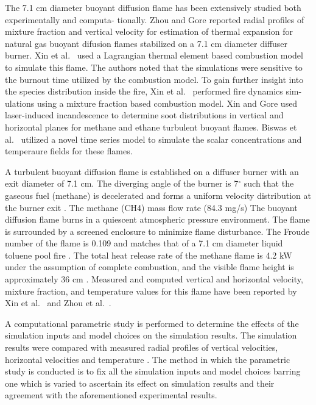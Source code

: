The 7.1 cm diameter buoyant diffusion flame has been extensively studied both experimentally and computa- tionally. Zhou and Gore \cite{Zhou:CS1998} reported radial profiles of mixture fraction and vertical velocity for estimation of thermal expansion for natural gas buoyant difusion flames stabilized on a 7.1 cm diameter diffuser burner. Xin et al.~\cite{Xin:CSS2002} used a Lagrangian thermal element based combustion model to simulate this flame. The authors noted that the simulations were sensitive to the burnout time utilized by the combustion model. To gain further insight into the species distribution inside the fire, Xin et al.~\cite{Xin:CF2005} performed fire dynamics sim- ulations using a mixture fraction based combustion model. Xin and Gore \cite{Xin:CS2005} used laser-induced incandescence to determine soot distributions in vertical and horizontal planes for methane and ethane turbulent buoyant flames. Biswas et al.~\cite{Biswas:CS2007} utilized a novel time series model to simulate the scalar concentrations and temperaure fields for these flames.

A turbulent buoyant diffusion flame is established on a diffuser burner with an exit diameter of 7.1 cm. The diverging angle of the burner is 7$^\circ$ such that the gaseous fuel (methane) is decelerated and forms a uniform velocity distribution at the burner exit \cite{Xin:CF2005}. The methane (CH4) mass flow rate (84.3 mg/s) The buoyant diffusion flame burns in a quiescent atmospheric pressure environment. The flame is surrounded by a screened enclosure to minimize flame disturbance. The Froude number of the flame is 0.109 and matches that of a 7.1 cm diameter liquid toluene pool fire \cite{Xin:CF2005,Zhou:CS1998}. The total heat release rate of the methane flame is 4.2 kW under the assumption of complete combustion, and the visible flame height is approximately 36 cm \cite{Xin:CF2005}. Measured and computed vertical and horizontal velocity, mixture fraction, and temperature values for this flame have been reported by Xin et al.~\cite{Xin:CF2005,Xin:PhD2002} and Zhou et al.~\cite{Zhou:CS1998,Zhou:PurduePhD1999}.

A computational parametric study is performed to determine the effects of the simulation inputs and model choices on the simulation results. The simulation results were compared with measured radial profiles of vertical velocities, horizontal velocities and temperature \cite{Xin:CF2005}. The method in which the parametric study is conducted is to fix all the simulation inputs and model choices barring one which is varied to ascertain its effect on simulation results and their agreement with the aforementioned experimental results.

